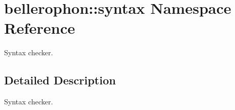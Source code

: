 \hypertarget{namespacebellerophon_1_1syntax}{}\section{bellerophon\+:\+:syntax Namespace Reference}
\label{namespacebellerophon_1_1syntax}


Syntax checker.  




\subsection{Detailed Description}
Syntax checker. 